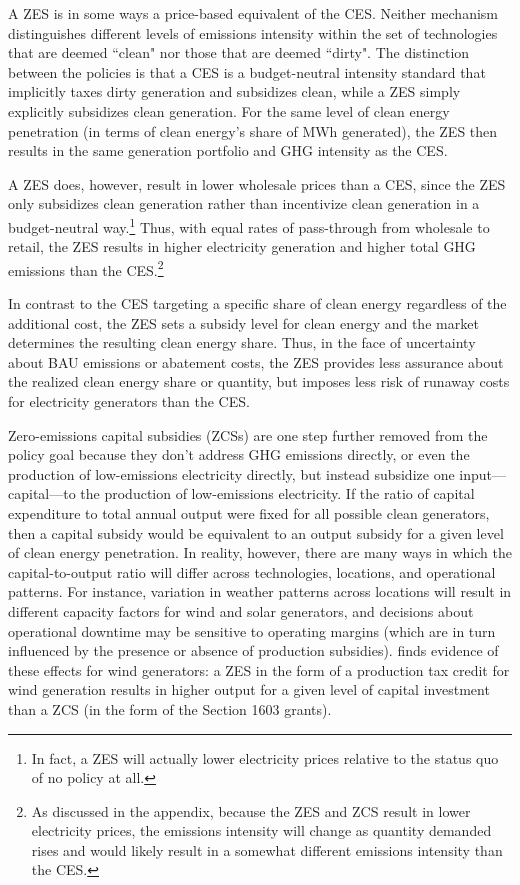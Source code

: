 \documentclass[12pt]{article}
\begin{document}
A ZES is in some ways a price-based equivalent of the CES. Neither mechanism distinguishes different levels of emissions intensity within the set of technologies that are deemed ``clean" nor those that are deemed ``dirty". The distinction between the policies is that a CES is a budget-neutral intensity standard that implicitly taxes dirty generation and subsidizes clean, while a ZES simply explicitly subsidizes clean generation. For the same level of clean energy penetration (in terms of clean energy's share of MWh generated), the ZES then results in the same generation portfolio and GHG intensity as the CES.

A ZES does, however, result in lower wholesale prices than a CES, since the ZES only subsidizes clean generation rather than incentivize clean generation in a budget-neutral way.\footnote{In fact, a ZES will actually lower electricity prices relative to the status quo of no policy at all.} Thus, with equal rates of pass-through from wholesale to retail, the ZES results in higher electricity generation and higher total GHG emissions than the CES.\footnote{As discussed in the appendix, because the ZES and ZCS result in lower electricity prices, the emissions intensity will change as quantity demanded rises and would likely result in a somewhat different emissions intensity than the CES.}

In contrast to the CES targeting a specific share of clean energy regardless of the additional cost, the ZES sets a subsidy level for clean energy and the market determines the resulting clean energy share. Thus, in the face of uncertainty about BAU emissions or abatement costs, the ZES provides less assurance about the realized clean energy share or quantity, but imposes less risk of runaway costs for electricity generators than the CES.

Zero-emissions capital subsidies (ZCSs) are one step further removed from the policy goal because they don't address GHG emissions directly, or even the production of low-emissions electricity directly, but instead subsidize one input---capital---to the production of low-emissions electricity.  If the ratio of capital expenditure to total annual output were fixed for all possible clean generators, then a capital subsidy would be equivalent to an output subsidy for a given level of clean energy penetration. In reality, however, there are many ways in which the capital-to-output ratio will differ across technologies, locations, and operational patterns. For instance, variation in weather patterns across locations will result in different capacity factors for wind and solar generators, and decisions about operational downtime may be sensitive to operating margins (which are in turn influenced by the presence or absence of production subsidies). \cite{aldy2018investment} finds evidence of these effects for wind generators: a ZES in the form of a production tax credit for wind generation results in higher output for a given level of capital investment than a ZCS (in the form of the Section 1603 grants).
\end{document}

